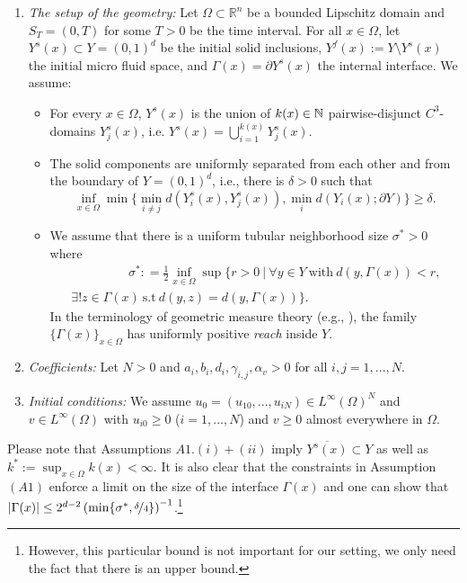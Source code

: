 \documentclass[reqno, 11pt]{amsart}
\numberwithin{equation}{section}
\def\R{{\Bbb R}}
\def\R{{\mathbb R}}
\def\N{{\Bbb N}}
\begin{document}
\begin{enumerate}
    \item[\textbf{(A1)}]\label{as:geometry}
        \textit{The setup of the geometry:} Let $\Omega\subset\R^n$ be a bounded Lipschitz domain and $S_T=(0,T)$ for some $T>0$ be the time interval.
        For all $x\in\Omega$, let $Y^s(x)\subset Y=(0,1)^d$ be the initial solid inclusions, $Y^f(x):=Y\setminus Y^s(x)$ the initial micro fluid space, and $\Gamma(x)=\partial Y^s(x)$ the internal interface.
        We assume:
        \begin{itemize}
            \item[$(i)$] For every $x\in\Omega$, $Y^s(x)$ is the union of $k(x)\in\N$ pairwise-disjunct $C^{3}$-domains $Y_j^s(x)$, i.e. $Y^s(x)=\bigcup_{i=1}^{k(x)}Y_j^s(x)$.
            \item[$(ii)$] The solid components are uniformly separated from each other and from the boundary of $Y=(0,1)^d$, i.e., there is $\delta>0$ such that
            \[
            \inf_{x\in\Omega}\min\{\min_{i\neq j}d(Y_i^s(x),Y_j^s(x)),\min_{i}d(Y_i(x);\partial Y)\}\geq \delta.
            \]
            \item[$(iii)$] We assume that there is a uniform tubular neighborhood size $\sigma^*>0$ where
            \begin{multline*}
            \hspace{2cm}\sigma^*:
            =\frac{1}{2}\inf_{x\in\Omega}\sup\{r>0 \ |\ \forall y\in Y \ \text{with}\ d(y,\Gamma(x))<r,\\ \ \exists! z\in \Gamma(x) \ \text{s.t} \ d(y,z)=d(y,\Gamma(x))\}.
            \end{multline*}
            In the terminology of geometric measure theory (e.g., \cite{Federer1969}), the family $\{\Gamma(x)\}_{x\in\Omega}$ has uniformly positive \textit{reach} inside $Y$.
        \end{itemize}
    \item[\textbf{(A2)}]\label{as:coefficients}
        \textit{Coefficients:} Let $N>0$ and $a_i, b_i,d_i,\gamma_{i,j},\alpha_v>0$ for all $i,j=1,...,N$.
    \item[\textbf{(A3)}]\label{as:initial-conditions}
        \textit{Initial conditions:} We assume $u_0=(u_{10},...,u_{iN})\in L^\infty(\Omega)^N$ and $v\in L^\infty(\Omega)$ with $u_{i0}\ge0$ ($i=1,...,N$) and $v\ge0$ almost everywhere in $\Omega$. 
\end{enumerate}
%
Please note that Assumptions $A1.(i)+(ii)$ imply $\overline{Y^s(x)}\subset Y$ as well as  $k^*:=\sup_{x\in\Omega}k(x)<\infty$.
It is also clear that the constraints in Assumption $(A1)$ enforce a limit on the size of the interface $\Gamma(x)$ and one can show that $|\Gamma(x)|\le 2^{d-2}\left(\min\{\sigma^*,\nicefrac\delta4\}\right)^{-1}$.\footnote{However, this particular bound is not important for our setting, we only need the fact that there is an upper bound.}
\end{document}
